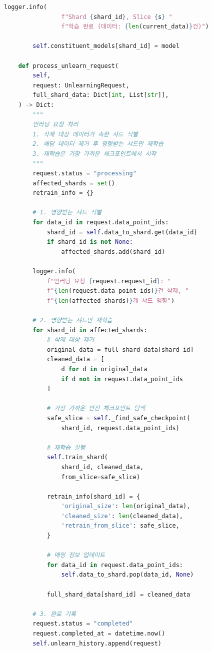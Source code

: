 \begin{lstlisting}[language=Python, caption={SISA 기반 머신 언러닝 구현}, label={lst:sisa_unlearning}]
            logger.info(
                f"Shard {shard_id}, Slice {s} "
                f"학습 완료 (데이터: {len(current_data)}건)")

        self.constituent_models[shard_id] = model

    def process_unlearn_request(
        self,
        request: UnlearningRequest,
        full_shard_data: Dict[int, List[str]],
    ) -> Dict:
        """
        언러닝 요청 처리
        1. 삭제 대상 데이터가 속한 샤드 식별
        2. 해당 데이터 제거 후 영향받는 샤드만 재학습
        3. 재학습은 가장 가까운 체크포인트에서 시작
        """
        request.status = "processing"
        affected_shards = set()
        retrain_info = {}

        # 1. 영향받는 샤드 식별
        for data_id in request.data_point_ids:
            shard_id = self.data_to_shard.get(data_id)
            if shard_id is not None:
                affected_shards.add(shard_id)

        logger.info(
            f"언러닝 요청 {request.request_id}: "
            f"{len(request.data_point_ids)}건 삭제, "
            f"{len(affected_shards)}개 샤드 영향")

        # 2. 영향받는 샤드만 재학습
        for shard_id in affected_shards:
            # 삭제 대상 제거
            original_data = full_shard_data[shard_id]
            cleaned_data = [
                d for d in original_data
                if d not in request.data_point_ids
            ]

            # 가장 가까운 안전 체크포인트 탐색
            safe_slice = self._find_safe_checkpoint(
                shard_id, request.data_point_ids)

            # 재학습 실행
            self.train_shard(
                shard_id, cleaned_data,
                from_slice=safe_slice)

            retrain_info[shard_id] = {
                'original_size': len(original_data),
                'cleaned_size': len(cleaned_data),
                'retrain_from_slice': safe_slice,
            }

            # 매핑 정보 업데이트
            for data_id in request.data_point_ids:
                self.data_to_shard.pop(data_id, None)

            full_shard_data[shard_id] = cleaned_data

        # 3. 완료 기록
        request.status = "completed"
        request.completed_at = datetime.now()
        self.unlearn_history.append(request)


\end{lstlisting}
